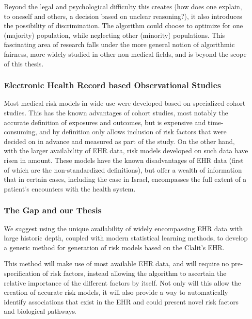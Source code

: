 \documentclass[a4paper,12pt]{article}
\begin{document}
		Beyond the legal and psychological difficulty this creates (how does one explain, to oneself and others, a decision based on unclear reasoning?), it also introduces the possibility of discrimination. The algorithm could choose to optimize for one (majority) population, while neglecting other (minority) populations\cite{Hebert-Johnson2017}. This fascinating area of research falls under the more general notion of algorithmic fairness, more widely studied in other non-medical fields\cite{Corbett-Davies2017}, and is beyond the scope of this thesis.
		
		\subsubsection{Electronic Health Record based Observational Studies}
		
		Most medical risk models in wide-use were developed based on specialized cohort studies\cite{Goldstein2016}. This has the known advantages of cohort studies, most notably the accurate definition of exposures and outcomes, but is expensive and time-consuming, and by definition only allows inclusion of risk factors that were decided on in advance and measured as part of the study. On the other hand, with the larger availability of EHR data, risk models developed on such data have risen in amount. These models have the known disadvantages of EHR data (first of which are the non-standardized definitions), but offer a wealth of information that in certain cases, including the case in Israel\cite{Lovis2015}, encompasses the full extent of a patient's encounters with the health system\cite{Goldstein2017}.
		
		\subsubsection{The Gap and our Thesis}
		
		We suggest using the unique availability of widely encompassing EHR data with large historic depth, coupled with modern statistical learning methods, to develop a generic method for generation of risk models based on the Clalit's EHR.
		
		This method will make use of most available EHR data, and will require no pre-specification of risk factors, instead allowing the algorithm to ascertain the relative importance of the different factors by itself. Not only will this allow the creation of accurate risk models, it will also provide a way to automatically identify associations that exist in the EHR and could present novel risk factors and biological pathways.
		
\end{document}
